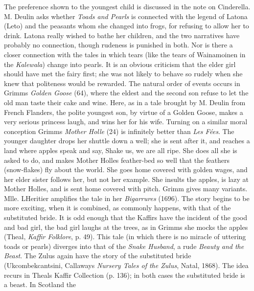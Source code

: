 \documentclass[14pt,a4paper]{memoir}
\begin{document}
{The preference shown to the youngest child is discussed in the note on
Cinderella. M. Deulin asks whether \emph{Toads and Pearls} is connected
with the legend of Latona (Leto) and the peasants whom she changed into
frogs, for refusing to allow her to
drink.
Latona really wished to bathe her children, and the two narratives have
probably no connection, though rudeness is punished in both. Nor is
there a closer connection with the tales in which tears (like the tears
of Wainamoinen in the \emph{Kalewala}) change into pearls. It is an
obvious criticism that the elder girl should have met the fairy first;
she was not likely to behave so rudely when she knew that politeness
would be rewarded. The natural order of events occurs in
Grimm\textquotesingle s \emph{Golden Goose} (64), where the eldest and
the second son refuse to let the old man taste their cake and wine.
Here, as in a tale brought by M. Deulin from French Flanders, the polite
youngest son, by virtue of a Golden Goose, makes a very serious princess
laugh, and wins her for his wife. Turning on a similar moral conception
Grimm\textquotesingle s \emph{Mother Holle} (24) is infinitely better
than \emph{Les Fées}. The younger daughter drops her shuttle down a
well; she is sent after it, and reaches a land where apples speak and
say, \textquotesingle Shake us, we are all ripe.\textquotesingle{} She
does all she is asked to do, and makes Mother Holle\textquotesingle s
feather-bed so well that the feathers (snow-flakes) fly about the world.
She goes home covered with golden wages, and her elder sister follows
her, but not her example. She insults the apples, is lazy at Mother
Holle\textquotesingle s, and is sent home covered with pitch. Grimm
gives many variants. Mlle. L\textquotesingle Heritier amplifies the tale
in her \emph{Bigarrures} (1696). The story begins to be more exciting,
when it is combined, as commonly happens, with that of the substituted
bride. It is odd enough that the Kaffirs have the incident of the good
and bad girl, the bad girl laughs at the trees, as in
Grimm\textquotesingle s she mocks the apples (Theal, \emph{Kaffir
Folklore}, p. 49). This tale (in which there is no miracle of uttering
toads or pearls) diverges into that of the \emph{Snake Husband}, a rude
\emph{Beauty and the Beast}. The Zulus again have the story of the
substituted bride (\textquotesingle Ukcombekcantsini,\textquotesingle{}
Callaway\textquotesingle s \emph{Nursery Tales of the Zulus}, Natal,
1868). The idea recurs in Theal\textquotesingle s Kaffir Collection (p.
136); in both cases the substituted bride is a beast. In Scotland the
}
\end{document}
